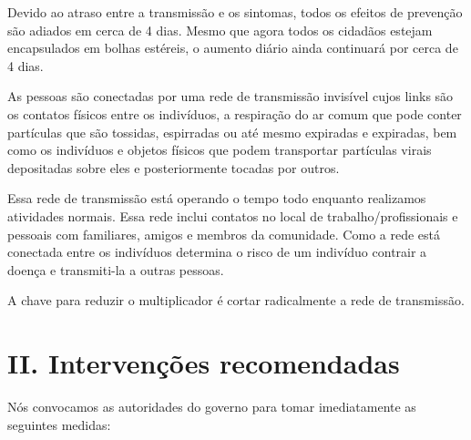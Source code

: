 \documentclass[onecolumn,journal]{IEEEtran}
\begin{document}
\begin{multicols}{2}
Devido ao atraso entre a transmissão e os sintomas, todos os efeitos de prevenção são adiados em cerca de 4 dias. Mesmo que agora todos os cidadãos estejam encapsulados em bolhas estéreis, o aumento diário ainda continuará por cerca de 4 dias.

As pessoas são conectadas por uma rede de transmissão invisível cujos links são os contatos físicos entre os indivíduos, a respiração do ar comum que pode conter partículas que são tossidas, espirradas ou até mesmo expiradas e expiradas, bem como os indivíduos e objetos físicos que podem transportar partículas virais depositadas sobre eles e posteriormente tocadas por outros. 

Essa rede de transmissão está operando o tempo todo enquanto realizamos atividades normais. Essa rede inclui contatos no local de trabalho/profissionais e pessoais com familiares, amigos e membros da comunidade. Como a rede está conectada entre os indivíduos determina o risco de um indivíduo contrair a doença e transmiti-la a outras pessoas.

A chave para reduzir o multiplicador é cortar radicalmente a rede de transmissão.

\section*{II. Intervenções recomendadas}

Nós convocamos as autoridades do governo para tomar imediatamente as seguintes medidas:


\end{multicols}
\end{document}
